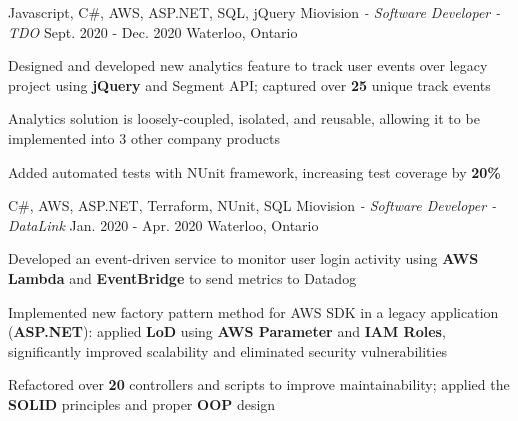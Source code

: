 \begin{siderules}
  \begin{cventries}
    \cventry
    {Javascript, C\#, AWS, ASP.NET, SQL, jQuery}
    {Miovision\hspace{0.15em} \bodyfontlight\itshape{- Software Developer - TDO}}
    {Sept. 2020 - Dec. 2020}
    {Waterloo, Ontario}
    {
      \begin{cvitems}
        \item {Designed and developed new analytics feature to track user events over legacy project using \textbf{jQuery} and Segment API; captured over \textbf{25} unique track events}
        \item {Analytics solution is loosely-coupled, isolated, and reusable, allowing it to be implemented into 3 other company products}
        \item {Added automated tests with NUnit framework, increasing test coverage by \textbf{20\%}}
      \end{cvitems}
    }
    \cventry
    {C\#, AWS, ASP.NET, Terraform, NUnit, SQL}
    {Miovision\hspace{0.15em} \bodyfontlight\itshape{- Software Developer - DataLink}}
    {Jan. 2020 - Apr. 2020}
    {Waterloo, Ontario}
    {
      \begin{cvitems}
        \item {Developed an event-driven service to monitor user login activity using \textbf{AWS Lambda} and \textbf{EventBridge} to send metrics to Datadog}
        \item {Implemented new factory pattern method for AWS SDK in a legacy application (\textbf{ASP.NET}): applied \textbf{LoD} using \textbf{AWS Parameter} and \textbf{IAM Roles}, significantly improved scalability and eliminated security vulnerabilities}
        \item {Refactored over \textbf{20} controllers and scripts to improve maintainability; applied the \textbf{SOLID} principles and proper \textbf{OOP} design}

\end{cvitems}}
\end{cventries}
\end{siderules}
